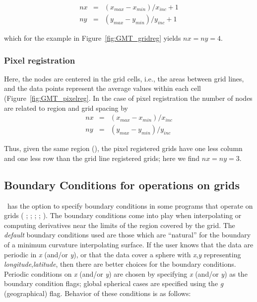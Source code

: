 \[ \begin{array}{ccl} 
nx & =	&	(x_{max} - x_{min}) / x_{inc} + 1	\\ 
ny & =	&	(y_{max} - y_{min}) / y_{inc} + 1
\end{array} \]

which for the example in Figure~\ref{fig:GMT_gridreg} yields $nx = ny = 4$.



\subsubsection{Pixel registration}

Here, the nodes are centered in the grid cells, i.e., the areas
between grid lines, and the data points represent the average
values within each cell (Figure~\ref{fig:GMT_pixelreg}.
In the case of pixel registration the number of nodes are related
to region and grid spacing by \\

\[ \begin{array}{ccl} 
nx & =	&	(x_{max} - x_{min}) / x_{inc}	\\ 
ny & =	&	(y_{max} - y_{min}) / y_{inc}
\end{array} \]

Thus, given the same region (), the pixel registered grids have one less
column and one less row than the grid line registered grids; here we
find $nx = ny = 3$.



\subsection{Boundary Conditions for operations on grids} 

\GMT\ has the option to specify boundary conditions in some programs
that operate on grids ( ; 
;  ;  ;
 ).  The boundary conditions come into play
when interpolating or computing derivatives near the limits of the
region covered by the grid. The \emph{default} boundary
conditions used are those which are ``natural'' for the boundary
of a minimum curvature interpolating surface.
If the user knows that the data are periodic in {\it x} (and/or
{\it y}), or that the data cover a sphere with {\it x},{\it y}
representing {\it longitude},{\it latitude}, then there are better
choices for the boundary conditions.
Periodic conditions on {\it x} (and/or {\it y}) are chosen by
specifying {\it x} (and/or {\it y}) as the boundary condition flags;
global spherical cases are specified using the {\it g} (geographical)
flag.  Behavior of these conditions is as follows:

